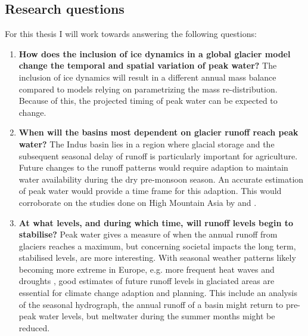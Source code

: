 \documentclass[12pt, a4paper]{article}
\begin{document}
\subsection{Research questions}
For this thesis I will work towards answering the following questions:
\begin{enumerate}
    \item \textbf{How does the inclusion of ice dynamics in a global glacier
    model change the temporal and spatial variation of peak water?} The
    inclusion of ice dynamics will result in a different annual mass balance
    compared to models relying on parametrizing the mass re-distribution.
    Because of this, the projected timing of peak water can be expected to
    change.
    \item \textbf{When will the basins most dependent on glacier runoff reach
    peak water?} The Indus basin lies in a region where glacial storage and the
    subsequent seasonal delay of runoff is particularly important for
    agriculture. Future changes to the runoff patterns would require adaption to
    maintain water availability during the dry pre-monsoon season. An accurate
    estimation of peak water would provide a time frame for this adaption. This
    would corroborate on the studies done on High Mountain Asia by
    \textcite{rounceGlacierMassChange2020} and
    \textcite{hussGlobalscaleHydrologicalResponse2018}.
    \item \textbf{At what levels, and during which time, will runoff levels
    begin to stabilise?} Peak water gives a measure of when the annual runoff
    from glaciers reaches a maximum, but concerning societal impacts the long
    term, stabilised levels, are more interesting. With seasonal weather
    patterns likely becoming more extreme in Europe, e.g. more frequent heat
    waves and droughts \parencite{ipccClimateChange20142014a}, good estimates of
    future runoff levels in glaciated areas are essential for climate change
    adaption and planning. This include an analysis of the seasonal hydrograph,
    the annual runoff of a basin might return to pre-peak water levels, but
    meltwater during the summer months might be reduced.

\end{enumerate}
\end{document}
